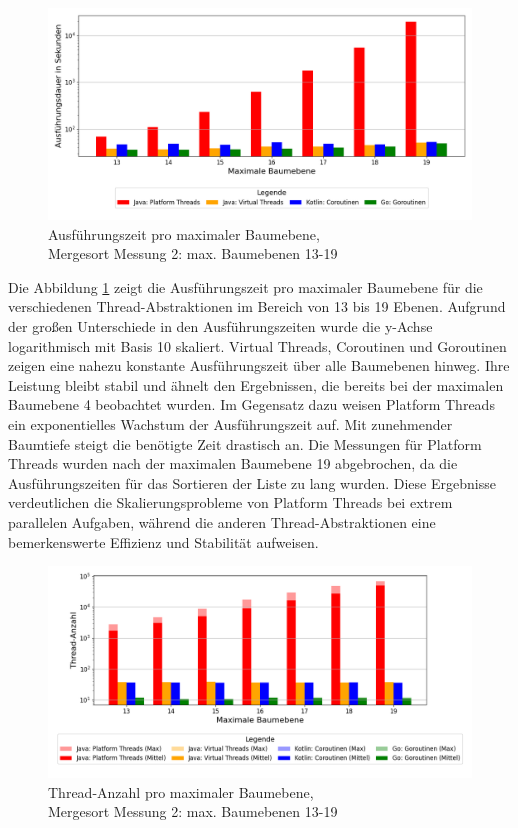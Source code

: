 \documentclass[fontsize=12pt,paper=a4,twoside=semi,parskip=half-,headsepline,headinclude]{scrreprt}
\begin{document}
\begin{figure}[H]
	\centering
	\includegraphics[scale=0.5]{figures/mergesort/Maximalebauebenen1-19_pvcg/execution_time_plot.png}
	\caption{Ausführungszeit pro maximaler Baumebene,\\ Mergesort Messung 2: max. Baumebenen 13-19}
	\label{fig:ms1-19Zeit}
\end{figure}

Die Abbildung \ref{fig:ms1-19Zeit} zeigt die Ausführungszeit pro maximaler Baumebene für die verschiedenen Thread-Abstraktionen im Bereich von 13 bis 19 Ebenen. Aufgrund der großen Unterschiede in den Ausführungszeiten wurde die y-Achse logarithmisch mit Basis 10 skaliert. Virtual Threads, Coroutinen und Goroutinen zeigen eine nahezu konstante Ausführungszeit über alle Baumebenen hinweg. Ihre Leistung bleibt stabil und ähnelt den Ergebnissen, die bereits bei der maximalen Baumebene 4 beobachtet wurden. Im Gegensatz dazu weisen Platform Threads ein exponentielles Wachstum der Ausführungszeit auf. Mit zunehmender Baumtiefe steigt die benötigte Zeit drastisch an. Die Messungen für Platform Threads wurden nach der maximalen Baumebene 19 abgebrochen, da die Ausführungszeiten für das Sortieren der Liste zu lang wurden. Diese Ergebnisse verdeutlichen die Skalierungsprobleme von Platform Threads bei extrem parallelen Aufgaben, während die anderen Thread-Abstraktionen eine bemerkenswerte Effizienz und Stabilität aufweisen.

\begin{figure}[H]
	\centering
	\includegraphics[scale=0.5]{figures/mergesort/Maximalebauebenen1-19_pvcg/num_threads_bar_plot.png}
	\caption{Thread-Anzahl pro maximaler Baumebene,\\ Mergesort Messung 2: max. Baumebenen 13-19}
	\label{fig:ms1-19Threads}
\end{figure}
\end{document}
